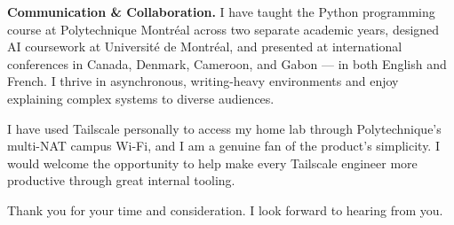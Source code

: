 \documentclass[10pt,a4paper,sans]{moderncv}
\begin{document}
\medskip

\textbf{Communication \& Collaboration.}\quad
I have taught the Python programming course at Polytechnique Montréal across two
separate academic years, designed AI coursework at Université de Montréal, and
presented at international conferences in Canada, Denmark, Cameroon, and Gabon —
in both English and French.  I thrive in asynchronous, writing-heavy
environments and enjoy explaining complex systems to diverse audiences.

\medskip

I have used Tailscale personally to access my home lab through Polytechnique's
multi-NAT campus Wi-Fi, and I am a genuine fan of the product's simplicity.  I
would welcome the opportunity to help make every Tailscale engineer more
productive through great internal tooling.

\medskip

Thank you for your time and consideration.  I look forward to hearing from you.

\makeletterclosing
\end{document}
